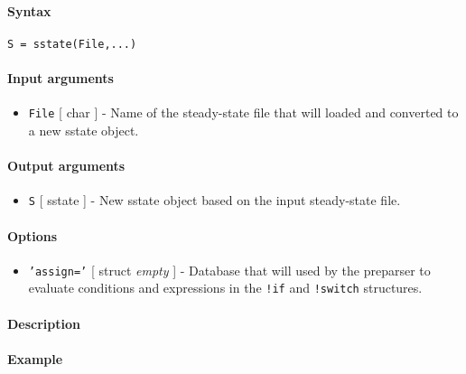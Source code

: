 


	\paragraph{Syntax}\label{syntax}

\begin{verbatim}
S = sstate(File,...)
\end{verbatim}

\paragraph{Input arguments}\label{input-arguments}

\begin{itemize}
\itemsep1pt\parskip0pt
\item
  \texttt{File} {[} char {]} - Name of the steady-state file that will
  loaded and converted to a new sstate object.
\end{itemize}

\paragraph{Output arguments}\label{output-arguments}

\begin{itemize}
\itemsep1pt\parskip0pt
\item
  \texttt{S} {[} sstate {]} - New sstate object based on the input
  steady-state file.
\end{itemize}

\paragraph{Options}\label{options}

\begin{itemize}
\itemsep1pt\parskip0pt
\item
  \texttt{'assign='} {[} struct \textbar{} \emph{empty} {]} - Database
  that will used by the preparser to evaluate conditions and expressions
  in the \texttt{!if} and \texttt{!switch} structures.
\end{itemize}

\paragraph{Description}\label{description}

\paragraph{Example}\label{example}


